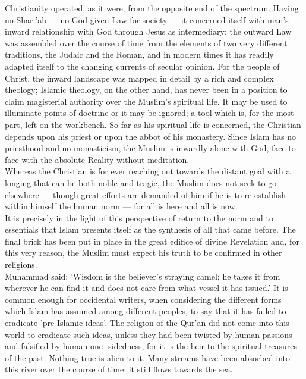 \documentclass[10pt, twoside,openright]{book}
\begin{document}
Christianity operated, as it were, from the opposite end of the spectrum. Having no Shari'ah --- no 
God-given Law for society --- it concerned itself with man's inward relationship with God through Jesus 
as intermediary; the outward Law was assembled over the course of time from the elements of two very 
different traditions, the Judaic and the Roman, and in modern times it has readily adapted itself to 
the changing currents of secular opinion. For the people of Christ, the inward landscape was mapped 
in detail by a rich and complex theology; Islamic theology, on the other hand, has never been in a 
position to claim magisterial authority over the Muslim's spiritual life. It may be used to 
illuminate points of doctrine or it may be ignored; a tool which is, for the most part, left on the 
workbench. So far as his spiritual life is concerned, the Christian depends upon his priest or upon 
the abbot of his monastery. Since Islam has no priesthood and no monasticism, the Muslim is inwardly 
alone with God, face to face with the absolute Reality without meditation. \\

Whereas the Christian is for ever reaching out towards the distant goal with a longing that can be 
both noble and tragic, the Muslim does not seek to go elsewhere --- though great efforts are demanded 
of him if he is to re-establish within himself the human norm --- for all is here and all is now. \\

It is precisely in the light of this perspective of return to the norm and to essentials that Islam 
presents itself as the synthesis of all that came before. The final brick has been put in place in 
the great edifice of divine Revelation and, for this very reason, the Muslim must expect his truth to 
be confirmed in other religions. \\

Muhammad said: 'Wisdom is the believer's straying camel; he takes it from wherever he can find it and 
does not care from what vessel it has issued.' It is common enough for occidental writers, when 
considering the different forms which Islam has assumed among different peoples, to say that it has 
failed to eradicate 'pre\hyp{}Islamic ideas'. The religion of the Qur'an did not come into this world to 
eradicate such ideas, unless they had been twisted by human passions and falsified by human one\hyp{}
sidedness, for it is the heir to the spiritual treasures of the past. Nothing true is alien to it. 
Many streams have been absorbed into this river over the course of time; it still flows towards the 
sea. \\
\end{document}
